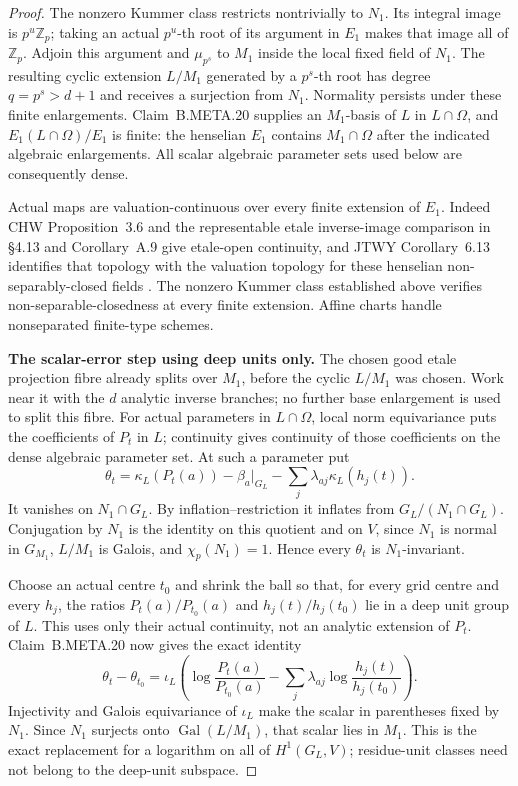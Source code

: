 \begin{proof}
The nonzero Kummer class restricts nontrivially
to $N_1$.
Its integral image is $p^u\mathbb Z_p$; taking
an actual $p^u$-th root of its argument in $E_1$
makes that image all of $\mathbb Z_p$.
Adjoin this argument and $\mu_{p^s}$ to $M_1$
inside the local fixed field of $N_1$.
The resulting cyclic extension $L/M_1$ generated
by a $p^s$-th root has degree $q=p^s>d+1$ and
receives a surjection from $N_1$.
Normality persists under these finite enlargements.
Claim~B.META.20 supplies an $M_1$-basis of $L$
in $L\cap\Omega$, and
$E_1(L\cap\Omega)/E_1$ is finite:
the henselian $E_1$ contains $M_1\cap\Omega$
after the indicated algebraic enlargements.
All scalar algebraic parameter sets used below
are consequently dense.

Actual maps are valuation-continuous over every
finite extension of $E_1$.
Indeed CHW Proposition~3.6 and the representable
etale inverse-image comparison in \S4.13 and
Corollary~A.9 give etale-open continuity, and
JTWY Corollary~6.13 identifies that topology
with the valuation topology for these henselian
non-separably-closed fields
\citep{AN_CHW2024,AN_JTWY2024}.
The nonzero Kummer class established above
verifies non-separable-closedness at every finite
extension.  Affine charts handle nonseparated
finite-type schemes.

\medskip\noindent\textbf{The scalar-error step using deep units only.}
The chosen good etale projection fibre already
splits over $M_1$, before the cyclic $L/M_1$
was chosen.  Work near it with the $d$ analytic
inverse branches; no further base enlargement
is used to split this fibre.
For actual parameters in $L\cap\Omega$, local
norm equivariance puts the coefficients of $P_t$
in $L$; continuity gives continuity of those
coefficients on the dense algebraic parameter set.
At such a parameter put
\[
 \theta_t=\kappa_L(P_t(a))-\beta_a|_{G_L}
                  -\sum_j\lambda_{aj}\kappa_L(h_j(t)).
\]
It vanishes on $N_1\cap G_L$.
By inflation--restriction it inflates from
$G_L/(N_1\cap G_L)$.
Conjugation by $N_1$ is the identity on this
quotient and on $V$, since $N_1$ is normal in
$G_{M_1}$, $L/M_1$ is Galois, and $\chi_p(N_1)=1$.
Hence every $\theta_t$ is $N_1$-invariant.

Choose an actual centre $t_0$ and shrink the ball
so that, for every grid centre and every $h_j$,
the ratios $P_t(a)/P_{t_0}(a)$ and
$h_j(t)/h_j(t_0)$ lie in a deep unit group of $L$.
This uses only their actual continuity, not an
analytic extension of $P_t$.
Claim~B.META.20 now gives the exact identity
\[
 \theta_t-\theta_{t_0}
   =\iota_L\left(
      \log\frac{P_t(a)}{P_{t_0}(a)}
        -\sum_j\lambda_{aj}\log\frac{h_j(t)}{h_j(t_0)}
             \right).                                        \tag{META.DV11}
\]
Injectivity and Galois equivariance of $\iota_L$
make the scalar in parentheses fixed by $N_1$.
Since $N_1$ surjects onto $\operatorname{Gal}(L/M_1)$,
that scalar lies in $M_1$.
This is the exact replacement for a logarithm on
all of $H^1(G_L,V)$; residue-unit classes need not
belong to the deep-unit subspace.


\end{proof}
